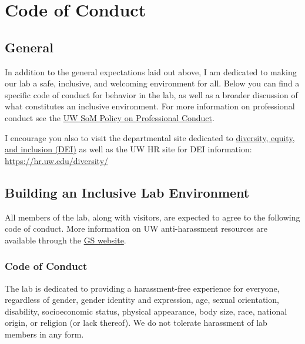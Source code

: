 \documentclass[
]{book}
\begin{document}
\hypertarget{code}{%
\chapter{Code of Conduct}\label{code}}

\hypertarget{general}{%
\section{General}\label{general}}

In addition to the general expectations laid out above, I am dedicated to making our lab a safe, inclusive, and welcoming environment for all. Below you can find a specific code of conduct for behavior in the lab, as well as a broader discussion of what constitutes an inclusive environment. For more information on professional conduct see the \href{https://www.gs.washington.edu/office/facultyresources/policies/conduct.pdf}{UW SoM Policy on Professional Conduct}.

I encourage you also to visit the departmental site dedicated to \href{https://www.gs.washington.edu/about/dei/index.htm}{diversity, equity, and inclusion (DEI)} as well as the UW HR site for DEI information: \url{https://hr.uw.edu/diversity/}

\hypertarget{building-an-inclusive-lab-environment}{%
\section{Building an Inclusive Lab Environment}\label{building-an-inclusive-lab-environment}}

All members of the lab, along with visitors, are expected to agree to the following code of conduct. More information on UW anti-harassment resources are available through the \href{https://www.gs.washington.edu/academics/gradprogram/handbook/general/antiharassment.htm}{GS website}.

\hypertarget{code-of-conduct}{%
\subsection{Code of Conduct}\label{code-of-conduct}}

The lab is dedicated to providing a harassment-free experience for everyone, regardless of gender, gender identity and expression, age, sexual orientation, disability, socioeconomic status, physical appearance, body size, race, national origin, or religion (or lack thereof). We do not tolerate harassment of lab members in any form.
\end{document}

